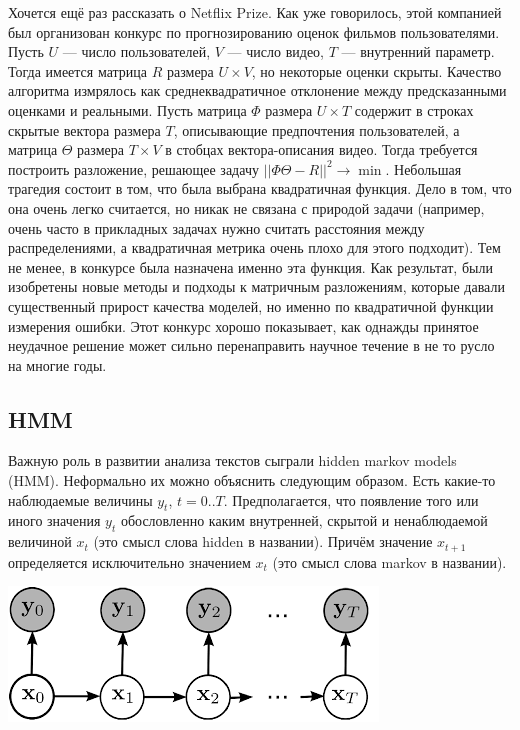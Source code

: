 \documentclass[a4paper,14pt]{extarticle}
\begin{document}
Хочется ещё раз рассказать о Netflix Prize. Как уже говорилось, этой компанией был организован конкурс по прогнозированию оценок фильмов пользователями. Пусть $U$ --- число пользователей, $V$ --- число видео, $T$ --- внутренний параметр. Тогда имеется матрица $R$ размера $U \times V$, но некоторые оценки скрыты. Качество алгоритма измрялось как среднеквадратичное отклонение между предсказанными оценками и реальными. Пусть матрица $\Phi$ размера $U \times T$ содержит в строках скрытые вектора размера $T$, описывающие предпочтения пользователей, а матрица $\Theta$ размера $T \times V$ в стобцах вектора-описания видео. Тогда требуется построить разложение, решающее задачу $||\Phi \Theta - R||^2 \to \min$. Небольшая трагедия состоит в том, что была выбрана квадратичная функция. Дело в том, что она очень легко считается, но никак не связана с природой задачи (например, очень часто в прикладных задачах нужно считать расстояния между распределениями, а квадратичная метрика очень плохо для этого подходит).  Тем не менее, в конкурсе была назначена именно эта функция. Как результат, были изобретены новые методы и подходы к матричным разложениям, которые давали существенный прирост качества моделей, но именно по квадратичной функции измерения ошибки. Этот конкурс хорошо показывает, как однажды принятое неудачное решение может сильно перенаправить научное течение в не то русло на многие годы.

\subsection{HMM}
Важную роль в развитии анализа текстов сыграли hidden markov models (HMM). Неформально их можно объяснить следующим образом. Есть какие-то наблюдаемые величины $y_t$, $t = 0..T$. Предполагается, что появление того или иного значения $y_t$ обословленно каким внутренней, скрытой и ненаблюдаемой величиной $x_t$ (это смысл слова hidden в названии). Причём значение $x_{t+1}$ определяется исключительно значением $x_t$ (это смысл слова markov в названии).

\medskip

\includegraphics[width=1.0\linewidth]{hmm.png}
\end{document}
